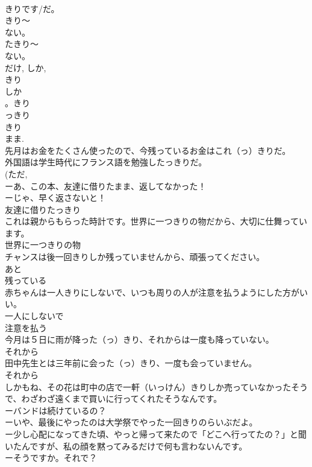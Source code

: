 \documentclass[8pt]{extreport}
\begin{document}
\begin{CJK}{UTF8}{min}
\\	きりです/だ。
\\	きり～
\\	ない。
\\	たきり～
\\	ない。
\\	だけ, しか, 
\\	きり
\\	しか
\\	。きり 
\\	っきり
\\	きり 
\\	まま. 
\\	先月はお金をたくさん使ったので、今残っているお金はこれ（っ）きりだ。
\\	外国語は学生時代にフランス語を勉強したっきりだ。
\\	(ただ, 
\\	ーあ、この本、友達に借りたまま、返してなかった！
\\	ーじゃ、早く返さないと！
\\	友達に借りたっきり 
\\	これは親からもらった時計です。世界に一つきりの物だから、大切に仕舞っています。
\\	世界に一つきりの物
\\	チャンスは後一回きりしか残っていませんから、頑張ってください。
\\	あと
\\	残っている
\\	赤ちゃんは一人きりにしないで、いつも周りの人が注意を払うようにした方がいい。
\\	一人にしないで
\\	注意を払う
\\	今月は５日に雨が降った（っ）きり、それからは一度も降っていない。
\\	それから 
\\	田中先生とは三年前に会った（っ）きり、一度も会っていません。
\\	それから 
\\	しかもね、その花は町中の店で一軒（いっけん）きりしか売っていなかったそうで、わざわざ遠くまで買いに行ってくれたそうなんです。
\\	ーバンドは続けているの？
\\	ーいや、最後にやったのは大学祭でやった一回きりのらいぶだよ。
\\	ー少し心配になってきた頃、やっと帰って来たので「どこへ行ってたの？」と聞いたんですが、私の顔を黙ってみるだけで何も言わないんです。
\\	ーそうですか。それで？

\end{CJK}
\end{document}
